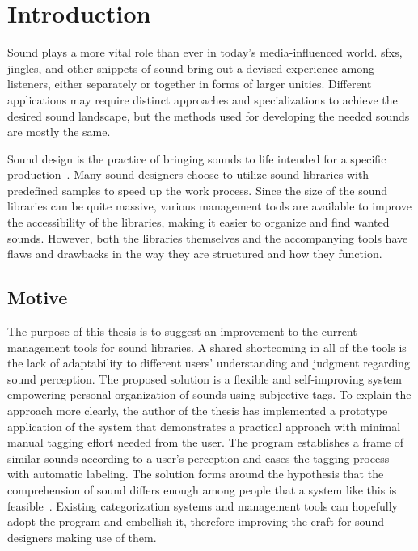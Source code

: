 \bgroup{}

\chapter{Introduction}
Sound plays a more vital role than ever in today's media-influenced world. \Glspl{sfx}, jingles, and other snippets of sound bring out a devised experience among listeners, either separately or together in forms of larger unities. Different applications may require distinct approaches and specializations to achieve the desired sound landscape, but the methods used for developing the needed sounds are mostly the same.

Sound design is the practice of bringing sounds to life intended for a specific production~\cite[1]{rep:knowledge_and_content-based_audio_retrieval_using_wordnet}. Many sound designers choose to utilize sound libraries with predefined samples to speed up the work process. Since the size of the sound libraries can be quite massive, various management tools are available to improve the accessibility of the libraries, making it easier to organize and find wanted sounds. However, both the libraries themselves and the accompanying tools have flaws and drawbacks in the way they are structured and how they function.

\section{Motive}\label{sec:motive}
The purpose of this thesis is to suggest an improvement to the current management tools for sound libraries. A shared shortcoming in all of the tools is the lack of adaptability to different users' understanding and judgment regarding sound perception. The proposed solution is a flexible and self-improving system empowering personal organization of sounds using subjective tags. To explain the approach more clearly, the author of the thesis has implemented a prototype application of the system that demonstrates a practical approach with minimal manual tagging effort needed from the user. The program establishes a frame of similar sounds according to a user's perception and eases the tagging process with automatic labeling. The solution forms around the hypothesis that the comprehension of sound differs enough among people that a system like this is feasible~\cite[2]{rep:psychoacoustically_informed_spectrography_and_timbre}. Existing categorization systems and management tools can hopefully adopt the program and embellish it, therefore improving the craft for sound designers making use of them.

